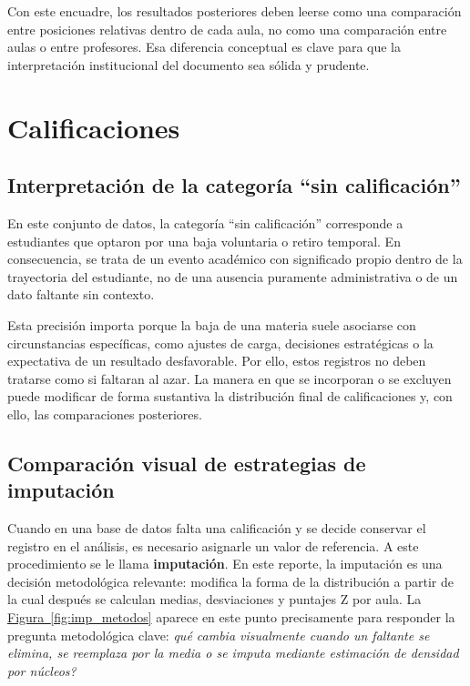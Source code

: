 \documentclass[10pt,letterpaper]{article} %
\numberwithin{figure}{subsection}
\let\oldsection\section
\renewcommand{\section}{\clearpage\oldsection}
\begin{document}
Con este encuadre, los resultados posteriores deben leerse como una comparación entre posiciones relativas dentro de cada aula, no como una comparación entre aulas o entre profesores. Esa diferencia conceptual es clave para que la interpretación institucional del documento sea sólida y prudente.



\FloatBarrier
\section{Calificaciones}

\subsection{Interpretación de la categoría ``sin calificación''}
En este conjunto de datos, la categoría ``sin calificación'' corresponde a estudiantes que optaron por una baja voluntaria o retiro temporal. En consecuencia, se trata de un evento académico con significado propio dentro de la trayectoria del estudiante, no de una ausencia puramente administrativa o de un dato faltante sin contexto.

Esta precisión importa porque la baja de una materia suele asociarse con circunstancias específicas, como ajustes de carga, decisiones estratégicas o la expectativa de un resultado desfavorable. Por ello, estos registros no deben tratarse como si faltaran al azar. La manera en que se incorporan o se excluyen puede modificar de forma sustantiva la distribución final de calificaciones y, con ello, las comparaciones posteriores.

\subsection{Comparación visual de estrategias de imputación}
Cuando en una base de datos falta una calificación y se decide conservar el registro en el análisis, es necesario asignarle un valor de referencia. A este procedimiento se le llama \textbf{imputación}. En este reporte, la imputación es una decisión metodológica relevante: modifica la forma de la distribución a partir de la cual después se calculan medias, desviaciones y puntajes Z por aula. La \hyperref[fig:imp_metodos]{Figura~\ref{fig:imp_metodos}} aparece en este punto precisamente para responder la pregunta metodológica clave: \emph{qué cambia visualmente cuando un faltante se elimina, se reemplaza por la media o se imputa mediante estimación de densidad por núcleos?}
\end{document}
